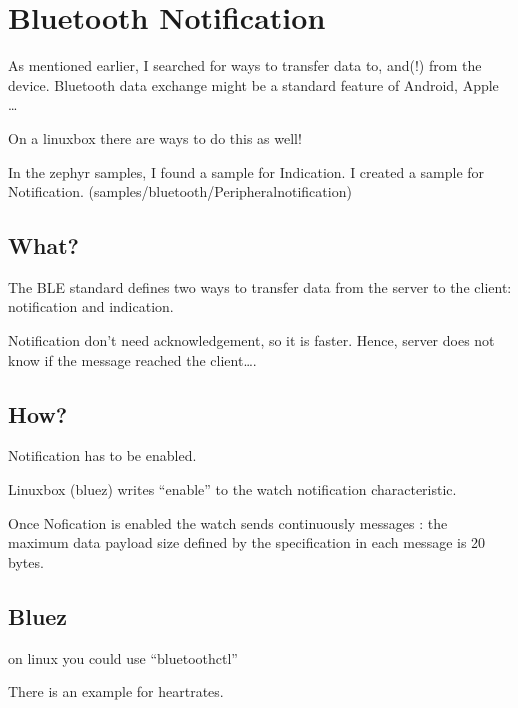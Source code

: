 \documentclass[letterpaper,10pt,english]{sphinxmanual}
\begin{document}
\chapter{Bluetooth Notification}
\label{\detokenize{notification:bluetooth-notification}}\label{\detokenize{notification::doc}}
As mentioned earlier, I searched for ways to transfer data to, and(!) from the device.
Bluetooth data exchange might be a standard feature of Android, Apple …

On a linuxbox there are ways to do this as well!

In the zephyr samples,  I found a sample for Indication.
I created a sample for Notification. (samples/bluetooth/Peripheral\sphinxhyphen{}notification)


\section{What?}
\label{\detokenize{notification:what}}
The BLE standard defines two ways to transfer data from the server to the client: notification and indication.

Notification don’t need acknowledgement, so it is faster. Hence, server does not know if the message reached the client….


\section{How?}
\label{\detokenize{notification:how}}
Notification has to be enabled.

Linuxbox (bluez) writes “enable” to the watch notification characteristic.

Once Nofication is enabled the watch sends continuously messages :
the maximum data payload size defined by the specification in each message is 20 bytes.


\section{Bluez}
\label{\detokenize{notification:bluez}}
on linux you could use  “bluetoothctl”

There is an example for heartrates.

\begin{sphinxVerbatim}[commandchars=\\\{\}]

 

 
 
 

        

   

 
 
\end{sphinxVerbatim}
\end{document}
